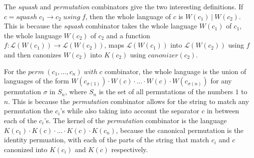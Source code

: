 \documentclass[acmsmall,review,anonymous]{acmart}
\newcommand{\kw}[1]{\ensuremath{\mathit{#1}}}
\newcommand{\squash}[3]{\ensuremath{\kw{squash} \; #1 \rightarrow #2\; \kw{using} \; #3}}
\newcommand{\perm}[2]{\ensuremath{\kw{perm}\; (#1)\; \kw{with}\; #2}}
\newcommand{\sep}{\ensuremath{\ | \ }}
\newcommand{\canonizer}{\ensuremath{\kw{canonizer}}}
\begin{document}
The \textit{squash} and \textit{permutation} combinators give the two
interesting definitions. If $c = \squash{c_1}{c_2}{f}$, then the whole language
of $c$ is $W(c_1) \sep W(c_2)$. This is because the \textit{squash} combinator
takes the whole language $W(c_1)$ of $c_1$, the whole language $W(c_2)$ of $c_2$
and a function $f : \mathcal{L}(W(c_1)) \longrightarrow \mathcal{L}(W(c_2))$,
maps $\mathcal{L}(W(c_1))$ into $\mathcal{L}(W(c_2))$ using $f$ and then
canonizes $W(c_2)$ into $K(c_2)$ using $\canonizer(c_2)$.

For the $\perm{c_1, \ldots, c_n}{c}$ combinator, the whole language is the
union of languages of the form $W(c_{\sigma(1)}) \cdot W(c) \cdot \ldots \cdot
W(c) \cdot W(c_{\sigma(n)})$ for any permutation $\sigma$ in $S_n$, where
$S_n$ is the set of all permutations of the numbers $1$ to $n$. This is because
the \textit{permutation} combinator allows for the string to match any
permutation the $c_i$'s while also taking into account the separator $c$ in
between each of the $c_i$'s. The kernel of the \textit{permutation} combinator
is the language $K(c_1) \cdot K(c) \cdot \ldots \cdot K(c) \cdot K(c_n)$,
because the canonical permutation is the identity permuation, with each of the
parts of the string that match $c_i$ and $c$ canonized into $K(c_i)$ and $K(c)$
respectively.
\end{document}
